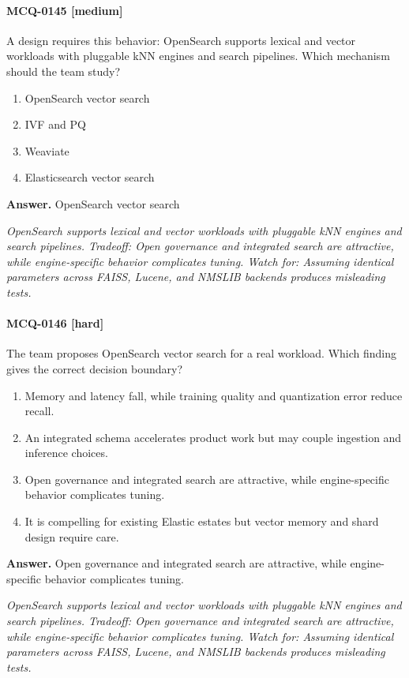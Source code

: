 \paragraph{MCQ-0145 [medium]} A design requires this behavior: OpenSearch supports lexical and vector workloads with pluggable kNN engines and search pipelines. Which mechanism should the team study?
\begin{enumerate}[label=\Alph*.]
\item OpenSearch vector search
\item IVF and PQ
\item Weaviate
\item Elasticsearch vector search
\end{enumerate}
\noindent\textbf{Answer.} OpenSearch vector search
\par\textit{OpenSearch supports lexical and vector workloads with pluggable kNN engines and search pipelines. Tradeoff: Open governance and integrated search are attractive, while engine-specific behavior complicates tuning. Watch for: Assuming identical parameters across FAISS, Lucene, and NMSLIB backends produces misleading tests.}
\paragraph{MCQ-0146 [hard]} The team proposes OpenSearch vector search for a real workload. Which finding gives the correct decision boundary?
\begin{enumerate}[label=\Alph*.]
\item Memory and latency fall, while training quality and quantization error reduce recall.
\item An integrated schema accelerates product work but may couple ingestion and inference choices.
\item Open governance and integrated search are attractive, while engine-specific behavior complicates tuning.
\item It is compelling for existing Elastic estates but vector memory and shard design require care.
\end{enumerate}
\noindent\textbf{Answer.} Open governance and integrated search are attractive, while engine-specific behavior complicates tuning.
\par\textit{OpenSearch supports lexical and vector workloads with pluggable kNN engines and search pipelines. Tradeoff: Open governance and integrated search are attractive, while engine-specific behavior complicates tuning. Watch for: Assuming identical parameters across FAISS, Lucene, and NMSLIB backends produces misleading tests.}
